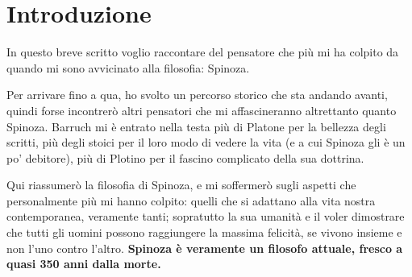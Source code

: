 \chapter*{Introduzione}

In questo breve scritto voglio raccontare del pensatore che più mi ha colpito da quando mi sono avvicinato alla filosofia: Spinoza.

Per arrivare fino a qua, ho svolto un percorso storico che sta andando avanti, quindi forse incontrerò  altri pensatori che mi affascineranno altrettanto quanto Spinoza. Barruch mi è entrato nella testa più di Platone per la bellezza degli scritti, più degli stoici per il loro modo di vedere la vita (e a cui Spinoza gli è un po' debitore), più di Plotino per il fascino complicato della sua dottrina.

Qui riassumerò la filosofia di Spinoza, e mi soffermerò sugli aspetti che  personalmente più mi hanno colpito: quelli che si adattano alla vita nostra contemporanea, veramente tanti; sopratutto la sua umanità e il voler dimostrare che tutti gli uomini possono raggiungere la massima felicità, se vivono insieme e non l'uno contro l'altro. \textbf{Spinoza è veramente un filosofo attuale, fresco a quasi 350 anni dalla morte.}